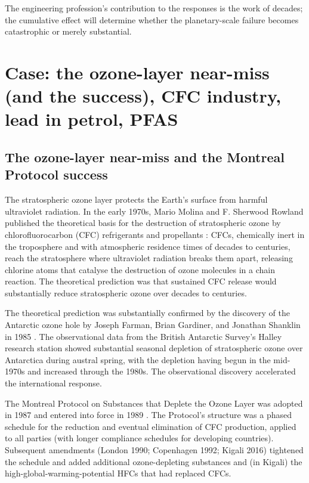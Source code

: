 The engineering profession's contribution to the responses is the work of decades; the cumulative effect will determine whether the planetary-scale failure becomes catastrophic or merely substantial.

\section{Case: the ozone-layer near-miss (and the success), CFC industry, lead in petrol, PFAS}

\subsection*{The ozone-layer near-miss and the Montreal Protocol success}

The stratospheric ozone layer protects the Earth's surface from harmful ultraviolet radiation. In the early 1970s, Mario Molina and F. Sherwood Rowland published the theoretical basis for the destruction of stratospheric ozone by chlorofluorocarbon (CFC) refrigerants and propellants \cite{paper:molina-rowland-1974}: CFCs, chemically inert in the troposphere and with atmospheric residence times of decades to centuries, reach the stratosphere where ultraviolet radiation breaks them apart, releasing chlorine atoms that catalyse the destruction of ozone molecules in a chain reaction. The theoretical prediction was that sustained CFC release would substantially reduce stratospheric ozone over decades to centuries.

The theoretical prediction was substantially confirmed by the discovery of the Antarctic ozone hole by Joseph Farman, Brian Gardiner, and Jonathan Shanklin in 1985 \cite{paper:farman-1985}. The observational data from the British Antarctic Survey's Halley research station showed substantial seasonal depletion of stratospheric ozone over Antarctica during austral spring, with the depletion having begun in the mid-1970s and increased through the 1980s. The observational discovery accelerated the international response.

The Montreal Protocol on Substances that Deplete the Ozone Layer was adopted in 1987 and entered into force in 1989 \cite{law:montreal-protocol-1987}. The Protocol's structure was a phased schedule for the reduction and eventual elimination of CFC production, applied to all parties (with longer compliance schedules for developing countries). Subsequent amendments (London 1990; Copenhagen 1992; Kigali 2016) tightened the schedule and added additional ozone-depleting substances and (in Kigali) the high-global-warming-potential HFCs that had replaced CFCs.

